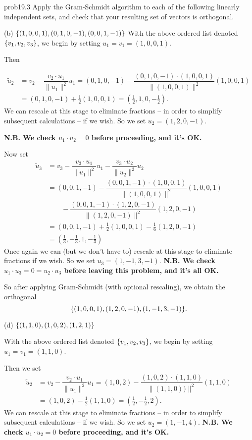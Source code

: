 \begin{sol}{prob19.3} Apply the Gram-Schmidt algorithm to each of the following linearly independent sets, and check that your resulting set of vectors is orthogonal.
\medskip

(b) $\{(1, 0, 0, 1),(0, 1, 0, -1),(0, 0, 1, -1) \}$
\soln With the above ordered list denoted $\{v_1, v_2, v_3 \}$, we begin by setting $u_1=v_1=(1, 0, 0, 1)$. 

Then 

\begin{align*}
\tilde u_2&= v_2 -\dfrac{v_2\cdot u_1}{\| u_1\|^2}u_1=(0, 1, 0, -1)-\dfrac{(0, 1, 0, -1)\cdot (1, 0, 0, 1)}{\| (1, 0, 0, 1)\|^2}(1, 0, 0, 1)\\
&=(0, 1, 0, -1)+\frac12 (1, 0, 0, 1)=(\frac12, 1,0,-\frac12).\end{align*}We can rescale at this stage to eliminate fractions -- in order to simplify subsequent calculations -- if we wish. So we set $u_2=(1,2,0,-1)$. 

{\bf N.B. We check $u_1\cdot u_2=0$ before proceeding, and it's OK.}

Now set 
\begin{align*}
 \tilde u_3 &=v_3 -\dfrac{v_3\cdot u_1}{\| u_1\|^2}u_1-\dfrac{v_3\cdot u_2}{\| u_2\|^2}u_2 \\
  &= (0, 0, 1, -1)-\dfrac{(0, 0, 1, -1)\cdot (1, 0, 0, 1)}{\| (1, 0, 0, 1)\|^2}(1, 0, 0, 1)\\
&\qquad-\dfrac{(0, 0, 1, -1)\cdot (1,2,0,-1)}{\| (1,2,0,-1)\|^2}(1,2,0,-1)\\
  &=(0, 0, 1, -1)+\frac{1}{2}(1, 0, 0, 1)-\frac16 (1,2,0,-1)\\
  &= (\frac13,-\frac13  , 1 ,-\frac13 )\end{align*}
Once again we can (but we don't have to) rescale at this stage to eliminate fractions if we wish. So we set $u_3=(1,-1,3,-1)$. 
 {\bf N.B. We check $u_1\cdot u_3=0=u_2\cdot u_3$ before leaving this problem, and it's all OK.}

So after applying Gram-Schmidt (with optional rescaling), we obtain the orthogonal $$\{(1, 0, 0, 1),(1,2,0,-1),(1,-1,3,-1) \}.$$
\medskip 
%

(d) $\{(1, 1, 0),(1, 0, 2),(1, 2, 1) \}$

\soln  With the above ordered list denoted $\{v_1, v_2, v_3 \}$, we begin by setting $u_1=v_1=(1, 1, 0)$.

Then we set \begin{align*}\tilde u_2&= v_2 -\dfrac{v_2\cdot u_1}{\| u_1\|^2}u_1=(1, 0, 2)-\dfrac{(1, 0, 2)\cdot (1, 1, 0)}{\| (1, 1, 0))\|^2}(1, 1, 0)\\&=(1, 0, 2)-\frac12(1, 1, 0)=(\frac12,-\frac12, 2).\end{align*}We can rescale at this stage to eliminate fractions -- in order to simplify subsequent calculations -- if we wish. So we set $u_2=(1,-1,4)$.  {\bf N.B. We check $u_1\cdot u_2=0$ before proceeding, and it's OK.}


\end{sol}

